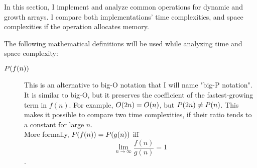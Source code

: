 In this section, I implement and analyze common operations for dynamic and growth arrays. I compare both implementations' time complexities, and space complexities if the operation allocates memory.

The following mathematical definitions will be used while analyzing time and space complexity:

\begin{description}
	\item[$P(f(n))$] This is an alternative to big-O notation that I will name "big-P notation". It is similar to big-O, but it preserves the coefficient of the fastest-growing term in $f(n)$. For example, $O(2n) = O(n)$, but $P(2n) \neq P(n)$. This makes it possible to compare two time complexities, if their ratio tends to a constant for large $n$.\\
	More formally, $P(f(n)) = P(g(n))$ iff $$\lim_{n \to \infty} {\frac{f(n)}{g(n)}} = 1$$.
\end{description}